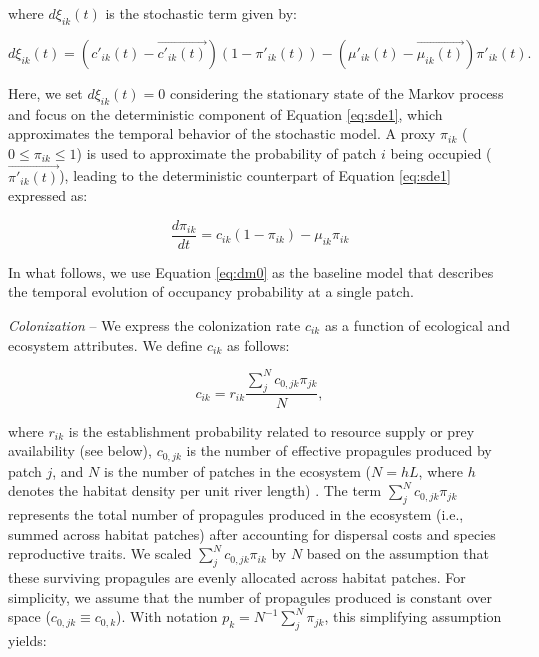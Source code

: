 \documentclass[11pt, class=article, crop=false]{standalone}
\begin{document}
where $d\xi_{ik}(t)$ is the stochastic term given by:

\begin{equation}
    d\xi_{ik}(t) = (c'_{ik}(t) - \overrightarrow{c'_{ik}(t)}) (1 - \pi'_{ik}(t)) - (\mu'_{ik}(t) - \overrightarrow{\mu_{ik}(t)}) \pi'_{ik}(t).
\end{equation}

Here, we set $d\xi_{ik}(t) = 0$ considering the stationary state of the Markov process and focus on the deterministic component of Equation \ref{eq:sde1}, which approximates the temporal behavior of the stochastic model.
A proxy $\pi_{ik}$ ($0 \le \pi_{ik} \le 1$) is used to approximate the probability of patch $i$ being occupied ($\overrightarrow{\pi'_{ik}(t)}$), leading to the deterministic counterpart of Equation \ref{eq:sde1} expressed as:

\begin{equation}
    \frac{d \pi_{ik}}{d t} = c_{ik} (1 - \pi_{ik}) - \mu_{ik} \pi_{ik}
    \label{eq:dm0}
\end{equation}

In what follows, we use Equation \ref{eq:dm0} as the baseline model that describes the temporal evolution of occupancy probability at a single patch.

\textit{Colonization} --
We express the colonization rate $c_{ik}$ as a function of ecological and ecosystem attributes.
We define $c_{ik}$ as follows:

\begin{equation}
    c_{ik} = r_{ik} \frac{\sum_{j}^N c_{0, jk} \pi_{jk}}{N},
    \label{eq:clnz}
\end{equation}

where $r_{ik}$ is the establishment probability related to resource supply or prey availability (see below), $c_{0, jk}$ is the number of effective propagules produced by patch $j$, and $N$ is the number of patches in the ecosystem ($N = hL$, where $h$ denotes the habitat density per unit river length) .
The term $\sum_{j}^N c_{0, jk} \pi_{jk}$ represents the total number of propagules produced in the ecosystem (i.e., summed across habitat patches) after accounting for dispersal costs and species reproductive traits.
We scaled $\sum_{j}^N c_{0, jk} \pi_{ik}$ by $N$ based on the assumption that these surviving propagules are evenly allocated across habitat patches.
For simplicity, we assume that the number of propagules produced is constant over space ($c_{0, jk} \equiv c_{0, k}$).
With notation $p_k = N^{-1}\sum_{j}^N \pi_{jk}$, this simplifying assumption yields:
\end{document}
